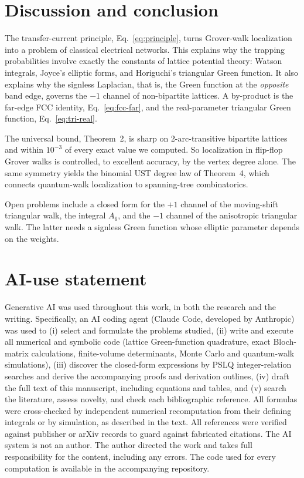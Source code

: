 \documentclass[aps,pra,10pt,twocolumn,superscriptaddress,nofootinbib]{revtex4-2}
\begin{document}
\section{Discussion and conclusion}
\label{sec:conclusion}

The transfer-current principle, Eq.~\eqref{eq:principle}, turns Grover-walk localization into a
problem of classical electrical networks. This explains why the trapping probabilities involve exactly
the constants of lattice potential theory: Watson integrals, Joyce's elliptic forms, and Horiguchi's
triangular Green function. It also explains why the signless Laplacian, that is, the Green function at the
\emph{opposite} band edge, governs the $-1$ channel of non-bipartite lattices. A by-product is the
far-edge FCC identity, Eq.~\eqref{eq:fcc-far}, and the real-parameter triangular Green function,
Eq.~\eqref{eq:tri-real}.

The universal bound, Theorem~2, is sharp on 2-arc-transitive bipartite lattices and within $10^{-3}$ of
every exact value we computed. So localization in flip-flop Grover walks is controlled, to excellent
accuracy, by the vertex degree alone. The same symmetry yields the binomial UST degree law of
Theorem~4, which connects quantum-walk localization to spanning-tree combinatorics.

Open problems include a closed form for the $+1$ channel of the moving-shift triangular walk, the
integral $A_6$, and the $-1$ channel of the anisotropic triangular walk. The latter needs a signless
Green function whose elliptic parameter depends on the weights.

\section*{AI-use statement}
Generative AI was used throughout this work, in both the research and the writing. Specifically,
an AI coding agent (Claude Code, developed by Anthropic) was used to
(i) select and formulate the problems studied,
(ii) write and execute all numerical and symbolic code (lattice Green-function quadrature,
exact Bloch-matrix calculations, finite-volume determinants, Monte Carlo and quantum-walk
simulations),
(iii) discover the closed-form expressions by PSLQ integer-relation searches and derive the
accompanying proofs and derivation outlines,
(iv) draft the full text of this manuscript, including equations and tables, and
(v) search the literature, assess novelty, and check each bibliographic reference.
All formulas were cross-checked by independent numerical recomputation from their defining
integrals or by simulation, as described in the text. All references were verified against
publisher or arXiv records to guard against fabricated citations. The AI system is not an
author. The author directed the work and takes full responsibility for the content, including
any errors. The code used for every computation is available in the accompanying repository.
\end{document}
